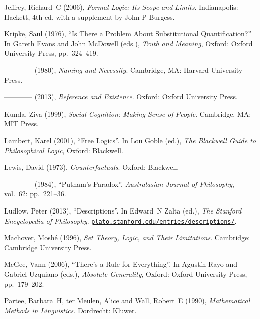 \documentclass[openany,leqno,11pt,draft]{book}
\theoremstyle{break}
\theoremstyle{definition}
\theoremstyle{remark}
\begin{document}
{\begin{thebibliography}{39}
Jeffrey, Richard~C (2006), \emph{Formal Logic: Its Scope and Limits}. Indianapolis: Hackett, 4th ed, with a supplement by John P Burgess.

Kripke, Saul (1976), \enquote{Is There a Problem About Substitutional
  Quantification?} In Gareth Evans and John McDowell (eds.), \emph{Truth and
  Meaning}, Oxford: Oxford University Press, pp.~324–419.

---\!\!---\!\!---\!\!--- (1980), \emph{Naming and Necessity}. Cambridge, MA:
  Harvard University Press.

---\!\!---\!\!---\!\!--- (2013), \emph{Reference and Existence}. Oxford:
  Oxford University Press.

Kunda, Ziva (1999), \emph{Social Cognition: Making Sense of People}.
  Cambridge, MA: MIT Press.

Lambert, Karel (2001), \enquote{Free Logics}. In Lou Goble (ed.), \emph{The
  Blackwell Guide to Philosophical Logic}, Oxford: Blackwell.

Lewis, David (1973), \emph{Counterfactuals}. Oxford: Blackwell.

---\!\!---\!\!---\!\!--- (1984), \enquote{Putnam's Paradox}. \emph{Australasian
  Journal of Philosophy}, vol.~62: pp.~221–36.

Ludlow, Peter (2013), \enquote{Descriptions}. In Edward~N Zalta (ed.), \emph{The Stanford Encyclopedia of Philosophy}. \urlprefix\href{http://plato.stanford.edu/entries/descriptions/}{\nolinkurl{plato.stanford.edu/entries/descriptions/}}.

Machover, Moshé (1996), \emph{Set Theory, Logic, and Their Limitations}.
  Cambridge: Cambridge University Press.

McGee, Vann (2006), \enquote{There's a Rule for Everything}. In Agust\'{i}n
  Rayo and Gabriel Uzquiano (eds.), \emph{Absolute Generality}, Oxford: Oxford
  University Press, pp.~179–202.

Partee, Barbara~H, {ter Meulen}, Alice and Wall, Robert~E (1990), \emph{Mathematical Methods in Linguistics}. Dordrecht: Kluwer.


\end{thebibliography}}
\end{document}
